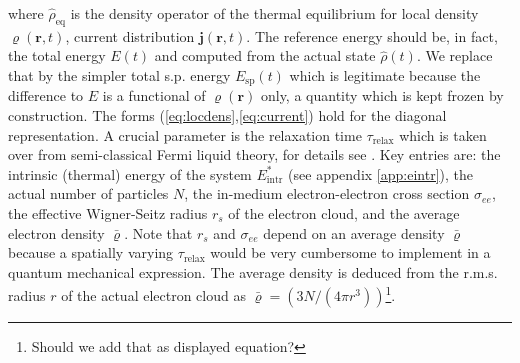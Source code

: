 \documentclass[final,1p]{elsarticle}
\newcommand{\PGRfoot}[1]{{\color{blue}\footnote{\color{blue} #1}}}
\begin{document}
where $\hat{\rho}_\mathrm{eq}$ is the density operator of the thermal
equilibrium for local density $\varrho(\mathbf{r},t)$, current
distribution $\mathbf{j}(\mathbf{r},t)$. The reference energy should
be, in fact, the total energy $E(t)$ and computed from the actual
state $\hat{\rho}(t)$. We replace that by the simpler total s.p.
energy $E_\mathrm{sp}(t)$ which is legitimate because the difference
to $E$ is a functional of $\varrho(\mathbf{r})$ only, a quantity which
is kept frozen by construction.  The forms
(\ref{eq:locdens},\ref{eq:current}) hold for the diagonal
representation.  A crucial parameter is the relaxation time
$\tau_\mathrm{relax}$ which is taken over from semi-classical Fermi
liquid theory, for details see \cite{Rei15a}.  Key entries are: the
intrinsic (thermal) energy of the system $E^*_\mathrm{intr}$ (see
appendix \ref{app:eintr}), the actual number of particles $N$, the
in-medium electron-electron cross section $\sigma_{ee}$, the effective
Wigner-Seitz radius $r_s$ of the electron cloud, and the average
electron density $\bar{\varrho}$.  Note that $r_s$ and $\sigma_{ee}$
depend on an average density $\bar{\varrho}$ because a spatially
varying $\tau_\mathrm{relax}$ would be very cumbersome to implement in
a quantum mechanical expression.  The average density is deduced from
the r.m.s. radius $r$ of the actual electron cloud as
$\bar{\varrho}=(3N/(4\pi r^3))$\PGRfoot{Should we add that as
  displayed equation?}.
\end{document}
